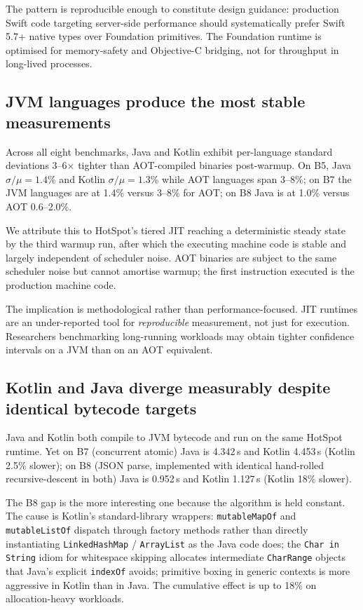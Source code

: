 \documentclass[10pt,conference]{IEEEtran}
\begin{document}
The pattern is reproducible enough to constitute design guidance:
production Swift code targeting server-side performance should
systematically prefer Swift 5.7+ native types over Foundation
primitives. The Foundation runtime is optimised for memory-safety
and Objective-C bridging, not for throughput in long-lived
processes.

\subsection{JVM languages produce the most stable measurements}

Across all eight benchmarks, Java and Kotlin exhibit
per-language standard deviations 3--6$\times$ tighter than
AOT-compiled binaries post-warmup. On B5, Java
$\sigma/\mu = 1.4\%$ and Kotlin $\sigma/\mu = 1.3\%$ while AOT
languages span 3--8\%; on B7 the JVM languages are at 1.4\%
versus 3--8\% for AOT; on B8 Java is at 1.0\% versus AOT 0.6--2.0\%.

We attribute this to HotSpot's tiered JIT reaching a deterministic
steady state by the third warmup run, after which the executing
machine code is stable and largely independent of scheduler noise.
AOT binaries are subject to the same scheduler noise but cannot
amortise warmup; the first instruction executed is the production
machine code.

The implication is methodological rather than performance-focused.
JIT runtimes are an under-reported tool for \emph{reproducible}
measurement, not just for execution. Researchers benchmarking
long-running workloads may obtain tighter confidence intervals on
a JVM than on an AOT equivalent.

\subsection{Kotlin and Java diverge measurably despite identical bytecode targets}

Java and Kotlin both compile to JVM bytecode and run on the same
HotSpot runtime. Yet on B7 (concurrent atomic) Java is 4.342\,s
and Kotlin 4.453\,s (Kotlin 2.5\% slower); on B8 (JSON parse,
implemented with identical hand-rolled recursive-descent in both)
Java is 0.952\,s and Kotlin 1.127\,s (Kotlin 18\% slower).

The B8 gap is the more interesting one because the algorithm is
held constant. The cause is Kotlin's standard-library wrappers:
\texttt{mutableMapOf} and \texttt{mutableListOf} dispatch through
factory methods rather than directly instantiating
\texttt{LinkedHashMap} / \texttt{ArrayList} as the Java code does;
the \texttt{Char in String} idiom for whitespace skipping
allocates intermediate \texttt{CharRange} objects that Java's
explicit \texttt{indexOf} avoids; primitive boxing in generic
contexts is more aggressive in Kotlin than in Java. The cumulative
effect is up to 18\% on allocation-heavy workloads.
\end{document}
